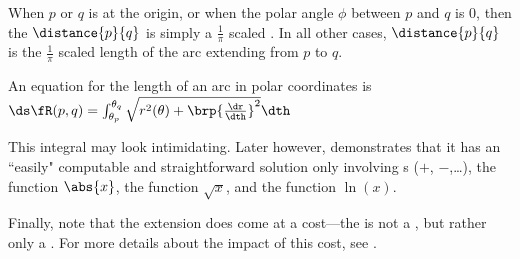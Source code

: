 When $p$ or $q$ is at the origin, or when the polar angle $\phi$ between $p$ and $q$ is $0$, 
then the  $\distance{p}{q}$ is simply a $\frac{1}{\pi}$ scaled  
.
In all other cases, $\distance{p}{q}$ is the $\frac{1}{\pi}$ scaled length of the 
 arc extending from $p$ to $q$.

An equation for the length of an arc in polar coordinates is
    \\\indentx$\ds\fR(p,q) = \int_{\theta_p}^{\theta_q} \sqrt{r^2(\theta) + \brp{\frac{\dr}{\dth}}^2}\dth $

This integral may look intimidating.
Later however,  demonstrates that it has an ``easily" computable and straightforward solution 
only involving s ($+$, $-$,\ldots), 
        the  function $\abs{x}$, 
        the  function $\sqrt{x}$, and
        the  function $\ln(x)$.

Finally, note that the extension does come at a cost---the  is not a  , 
        but rather only a  .
        For more details about the impact of this cost, see .


